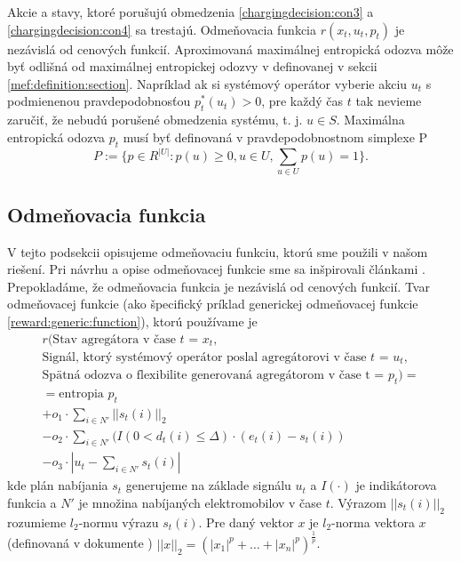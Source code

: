 Akcie a stavy, ktoré porušujú obmedzenia \eqref{chargingdecision:con3} a \eqref{chargingdecision:con4} sa trestajú. Odmeňovacia funkcia $r(x_{t}, u_{t}, p_{t})$ je nezávislá od cenových funkcií. Aproximovaná maximálnej entropická odozva môže byť odlišná od maximálnej entropickej odozvy v definovanej v sekcii \ref{mef:definition:section}. Napríklad ak si systémový operátor vyberie akciu $u_{t}$ s podmienenou pravdepodobnosťou $p_{t}^{*}(u_{t}) > 0$, pre každý čas $t$ tak nevieme zaručiť, že nebudú porušené obmedzenia systému, t. j. $u \in S$.                                                                                 
Maximálna entropická odozva $p_{t}$ musí byť definovaná v pravdepodobnostnom simplexe P
\begin{equation}
    \label{simplex}
    P := \{p \in R^{|U|}: p(u) \geq 0, u \in U,\sum_{u \in U}p(u) = 1 \}.
\end{equation}                                                                                                                                              
                                                

\subsection{Odmeňovacia funkcia}
V tejto podsekcii opisujeme odmeňovaciu funkciu, ktorú sme použili v našom riešení.
Pri návrhu a opise odmeňovacej funkcie sme sa inšpirovali článkami  \cite{Li_2021,Li_information_aggregation}.
Prepokladáme, že odmeňovacia funkcia je nezávislá od cenových funkcií. Tvar odmeňovacej funkcie (ako špecifický príklad generickej odmeňovacej funkcie \eqref{reward:generic:function}), ktorú používame je
\begin{gather*}
    r(\text{Stav agregátora v čase $t$ = $x_{t}$}, \\
    \text{Signál, ktorý systémový operátor poslal agregátorovi v čase $t$ = $u_{t}$},\\  
    \text{Spätná odozva o flexibilite generovaná agregátorom v čase t = $p_{t}$}) = \\
     = \text{entropia $p_{t}$} \\
     + o_{1} \cdot \sum_{i \in N'}||s_{t}(i)||_{2}  \\
     - o_{2} \cdot \sum_{i \in N'}(I(0 < d_{t}(i) \leq \Delta) \cdot (e_{t}(i) - s_{t}(i)) \\
     - o_{3} \cdot |u_{t} - \sum_{i \in N'}s_{t}(i)|
\end{gather*}
kde plán nabíjania $s_{t}$ generujeme na základe signálu $u_{t}$ a $I(\cdot)$ je indikátorova funkcia a $N'$ je množina nabíjaných elektromobilov v čase $t$.
Výrazom $||s_{t}(i)||_{2}$ rozumieme $l_{2}$-normu výrazu $s_{t}(i)$. Pre daný vektor $x$ je $l_{2}$-norma vektora $x$ (definovaná v dokumente \cite{normedspaces}) $||x||_{2} = (|x_{1}|^{p} + \dots + |x_{n}|^{p})^{\frac{1}{p}}$.

